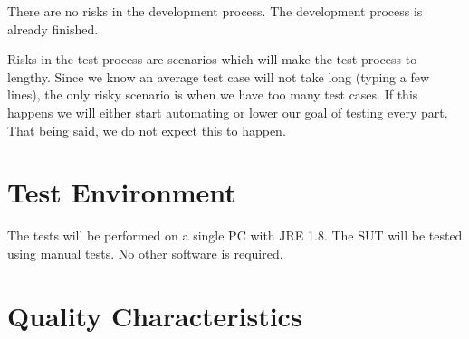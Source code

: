 \documentclass[11pt,a4paper]{article}
\begin{document}
There are no risks in the development process. The development process is already finished.

Risks in the test process are scenarios which will make the test process to lengthy. Since we know an average test case will not take long (typing a few lines), the only risky scenario is when we have too many test cases. If this happens we will either start automating or lower our goal of testing every part. That being said, we do not expect this to happen.

\section{Test Environment}
The tests will be performed on a single PC with JRE 1.8. The SUT will be tested using manual tests. No other software is required.

\section{Quality Characteristics}

\end{document}
